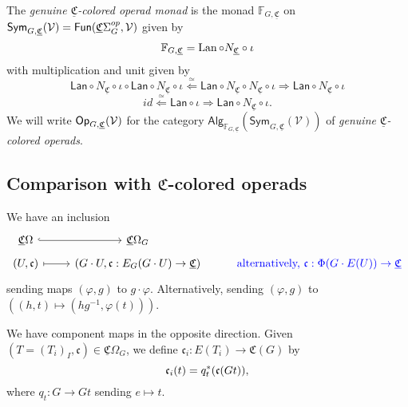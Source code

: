 \documentclass[a4paper,10pt
,draft
]{article}%
\renewcommand{\phi}{\varphi}
\newcommand{\UC}{\underline{\mathfrak C}}
\renewcommand{\1}{\ensuremath{\mathbb{id}}}
\begin{document}
\begin{definition}
      The \textit{genuine $\UC$-colored operad monad} is the monad
      $\mathbb F_{G,\UC}$ on $\Sym_{G, \UC}(\V) = \mathsf{Fun}(\UC\Sigma_G^{op}, \V)$ given by
      \begin{equation}
            \mathbb F_{G,\UC} = \Lan \circ N_{\UC} \circ \iota
      \end{equation}
      with multiplication and unit given by
      \begin{equation}
            \mathsf{Lan} \circ N_{\UC} \circ \iota \circ
            \mathsf{Lan} \circ N_{\UC} \circ \iota
            \overset{\simeq}{\Leftarrow}
            \mathsf{Lan} \circ N_{\UC} \circ  N_{\UC} \circ \iota
            \Rightarrow
            \mathsf{Lan} \circ N_{\UC} \circ \iota
      \end{equation}
      \begin{equation}
            id \overset{\simeq}{\Leftarrow} \mathsf{Lan} \circ \iota
            \Rightarrow
            \mathsf{Lan} \circ N_{\UC} \circ \iota.
      \end{equation}
      We will write $\Op_{G,\UC}(\V)$ for the category 
      $\mathsf{Alg}_{\mathbb{F}_{G,\UC}}(\mathsf{Sym}_{G,\UC}(\mathcal{V}))$ of \textit{genuine $\UC$-colored operads}.
\end{definition}



\subsection{Comparison with $\mathfrak C$-colored operads}

We have an inclusion
\begin{equation}
      \begin{tikzcd}[row sep = tiny]
            \UC\Omega \arrow[r, hookrightarrow]
            &
            \UC\Omega_G
            \\
            (U, \mathfrak c) \arrow[r, mapsto]
            &
            (G \cdot U, \mathfrak c: E_G(G \cdot U) \to \UC)
            &
            \mbox{\color{blue} alternatively, $\mathfrak c: \Phi(G \cdot E(U)) \to \UC$}
      \end{tikzcd}
\end{equation}
sending maps $(\phi, g)$ to $g \cdot \phi$.
{\color{blue} Alternatively, sending $(\phi,g)$ to $((h,t) \mapsto (hg^{-1}, \phi(t)))$.}

We have component maps in the opposite direction.
Given $(T = (T_i)_I, \mathfrak c) \in \UC\Omega_G$, we define
$\mathfrak c_i: E(T_i) \to \mathfrak C(G)$ by
\begin{equation}
      \mathfrak c_i(t) = q_t^{\**}(\mathfrak c (G t)),
\end{equation}
where
$q_t: G \to Gt$ sending $e \mapsto t$. 
\end{document}
